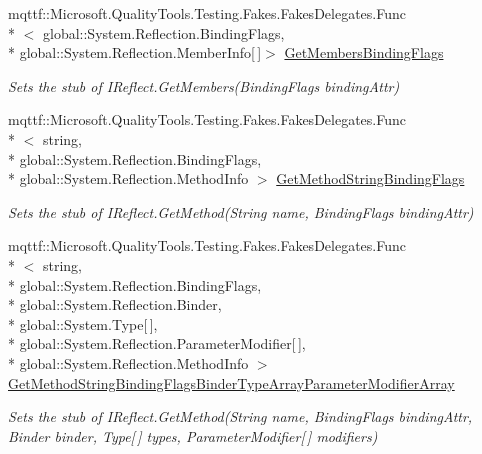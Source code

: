 \begin{DoxyCompactItemize}
mqttf\-::\-Microsoft.\-Quality\-Tools.\-Testing.\-Fakes.\-Fakes\-Delegates.\-Func\\*
$<$ global\-::\-System.\-Reflection.\-Binding\-Flags, \\*
global\-::\-System.\-Reflection.\-Member\-Info\mbox{[}$\,$\mbox{]}$>$ \hyperlink{class_system_1_1_reflection_1_1_fakes_1_1_stub_i_reflect_a7b5d3790ac11225f66c09d645a6f8464}{Get\-Members\-Binding\-Flags}
\begin{DoxyCompactList}\small\item\em Sets the stub of I\-Reflect.\-Get\-Members(\-Binding\-Flags binding\-Attr)\end{DoxyCompactList}\item 
mqttf\-::\-Microsoft.\-Quality\-Tools.\-Testing.\-Fakes.\-Fakes\-Delegates.\-Func\\*
$<$ string, \\*
global\-::\-System.\-Reflection.\-Binding\-Flags, \\*
global\-::\-System.\-Reflection.\-Method\-Info $>$ \hyperlink{class_system_1_1_reflection_1_1_fakes_1_1_stub_i_reflect_a21c41e101c60ceac13405e44ef3f0a28}{Get\-Method\-String\-Binding\-Flags}
\begin{DoxyCompactList}\small\item\em Sets the stub of I\-Reflect.\-Get\-Method(\-String name, Binding\-Flags binding\-Attr)\end{DoxyCompactList}\item 
mqttf\-::\-Microsoft.\-Quality\-Tools.\-Testing.\-Fakes.\-Fakes\-Delegates.\-Func\\*
$<$ string, \\*
global\-::\-System.\-Reflection.\-Binding\-Flags, \\*
global\-::\-System.\-Reflection.\-Binder, \\*
global\-::\-System.\-Type\mbox{[}$\,$\mbox{]}, \\*
global\-::\-System.\-Reflection.\-Parameter\-Modifier\mbox{[}$\,$\mbox{]}, \\*
global\-::\-System.\-Reflection.\-Method\-Info $>$ \hyperlink{class_system_1_1_reflection_1_1_fakes_1_1_stub_i_reflect_aabf22ba0c77ea6bf66d3b10959be0a8d}{Get\-Method\-String\-Binding\-Flags\-Binder\-Type\-Array\-Parameter\-Modifier\-Array}
\begin{DoxyCompactList}\small\item\em Sets the stub of I\-Reflect.\-Get\-Method(\-String name, Binding\-Flags binding\-Attr, Binder binder, Type\mbox{[}$\,$\mbox{]} types, Parameter\-Modifier\mbox{[}$\,$\mbox{]} modifiers)\end{DoxyCompactList}\item 

\end{DoxyCompactItemize}
